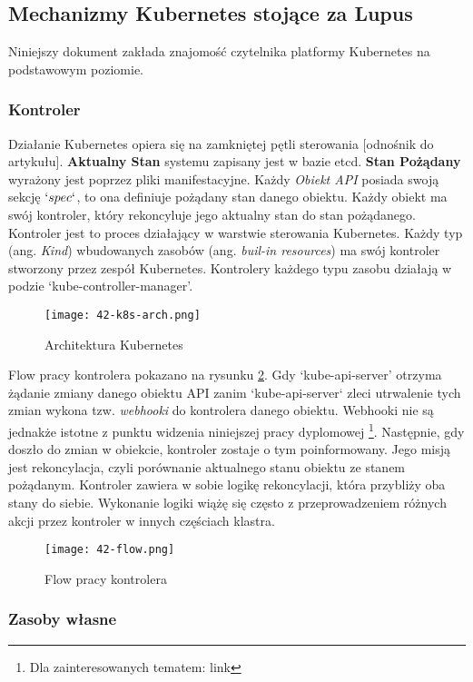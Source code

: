 \subsection{Mechanizmy Kubernetes stojące za Lupus}
Niniejszy dokument zakłada znajomość czytelnika platformy Kubernetes na podstawowym poziomie.

\subsubsection{Kontroler}
Działanie Kubernetes opiera się na zamkniętej pętli sterowania [odnośnik do artykułu]. \textbf{Aktualny Stan} systemu zapisany jest w bazie etcd. \textbf{Stan Pożądany} wyrażony jest poprzez pliki manifestacyjne. Każdy \textit{Obiekt API} posiada swoją sekcję $`spec`$, to ona definiuje pożądany stan danego obiektu. Każdy obiekt ma swój kontroler, który rekoncyluje jego aktualny stan do stan pożądanego. Kontroler jest to proces działający w warstwie sterowania Kubernetes. Każdy typ (ang. \textit{Kind}) wbudowanych zasobów (ang. \textit{buil-in resources}) ma swój kontroler stworzony przez zespół Kubernetes. Kontrolery każdego typu zasobu działają w podzie `kube-controller-manager'. 

\begin{figure}[!h]
    \centering \texttt{[image: 42-k8s-arch.png]}
    \caption{Architektura Kubernetes}\label{fig:42-k8s-arch}
\end{figure}

Flow pracy kontrolera pokazano na rysunku \ref{fig:42-flow}. Gdy `kube-api-server' otrzyma żądanie zmiany danego obiektu API zanim `kube-api-server` zleci utrwalenie tych zmian wykona tzw. \textit{webhooki} do kontrolera danego obiektu. Webhooki nie są jednakże istotne z punktu widzenia niniejszej pracy dyplomowej \footnote{Dla zainteresowanych tematem: link}. Następnie, gdy doszło do zmian w obiekcie, kontroler zostaje o tym poinformowany. Jego misją jest rekoncylacja, czyli porównanie aktualnego stanu obiektu ze stanem pożądanym. Kontroler zawiera w sobie logikę rekoncylacji, która przybliży oba stany do siebie. Wykonanie logiki wiążę się często z przeprowadzeniem różnych akcji przez kontroler w innych częściach klastra. 

\begin{figure}[!h]
    \centering \texttt{[image: 42-flow.png]}
    \caption{Flow pracy kontrolera}\label{fig:42-flow}
\end{figure}

\subsubsection{Zasoby własne} 


